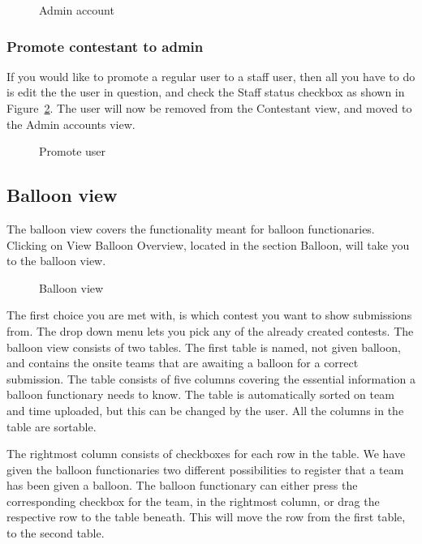 \begin{figure}
\centering
	\caption{Admin account}
	\label{fig:createAdmin}
\end{figure}

\subsubsection{Promote contestant to admin}

If you would like to promote a regular user to a staff user, then all
you have to do is edit the the user in question, and check the Staff
status checkbox as shown in Figure~\ref{fig:promoteUser}. The user will now be removed
from the Contestant view, and moved to the Admin accounts view. 

\begin{figure}
\centering
	\caption{Promote user}
	\label{fig:promoteUser}
\end{figure}


\subsection{Balloon view}

The balloon view covers the functionality meant for balloon
functionaries. Clicking on View Balloon Overview, located in the
section Balloon, will take you to the balloon view. 

\begin{figure}
\centering
	\caption{Balloon view}
	\label{fig:balloonView}
\end{figure}

The first choice you are met with, is which contest you want to show
submissions from. The drop down menu lets you pick any of the already
created contests. The balloon view consists of two tables. The first
table is named, not given balloon, and contains the onsite teams that
are awaiting a balloon for a correct submission. The table consists of
five columns covering the essential information a balloon functionary
needs to know. The table is automatically sorted on team and time
uploaded, but this can be changed by the user. All the columns in the
table are sortable.

The rightmost column consists of checkboxes for each row in the table.
We have given the balloon functionaries two different possibilities to
register that a team has been given a balloon. The balloon functionary
can either press the corresponding checkbox for the team, in the
rightmost column, or drag the respective row to the table beneath. This
will move the row from the first table, to the second table.

